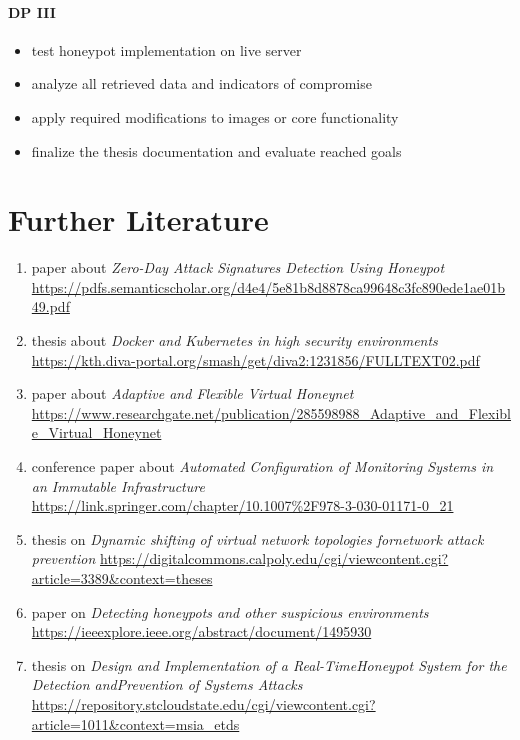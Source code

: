 \documentclass[12pt,a4paper,twoside]{report}
\begin{document}
\subsubsection{DP III}\label{dp-iii}

\begin{itemize}
\item
  test honeypot implementation on live server
\item
  analyze all retrieved data and indicators of compromise
\item
  apply required modifications to images or core functionality
\item
  finalize the thesis documentation and evaluate reached goals
\end{itemize}

\chapter{Further Literature}\label{further-literature}

\begin{enumerate}
	\item paper about \emph{Zero-Day Attack Signatures Detection Using Honeypot} \url{https://pdfs.semanticscholar.org/d4e4/5e81b8d8878ca99648c3fc890ede1ae01b49.pdf}
	
	\item thesis about \emph{Docker and Kubernetes in high security environments} \url{https://kth.diva-portal.org/smash/get/diva2:1231856/FULLTEXT02.pdf}
	
	\item paper about \emph{Adaptive and Flexible Virtual Honeynet}
	\url{https://www.researchgate.net/publication/285598988_Adaptive_and_Flexible_Virtual_Honeynet}
	
	\item conference paper about \emph{Automated Configuration of Monitoring Systems in an Immutable Infrastructure} \url{https://link.springer.com/chapter/10.1007%2F978-3-030-01171-0_21}
		
	\item thesis on \emph{Dynamic shifting of virtual network topologies fornetwork attack prevention} \url{https://digitalcommons.calpoly.edu/cgi/viewcontent.cgi?article=3389&context=theses}
	
	\item paper on \emph{Detecting honeypots and other suspicious environments} \url{https://ieeexplore.ieee.org/abstract/document/1495930}
	
	\item thesis on \emph{Design and Implementation of a Real-TimeHoneypot System for the Detection andPrevention of Systems Attacks} \url{https://repository.stcloudstate.edu/cgi/viewcontent.cgi?article=1011&context=msia_etds}
\end{enumerate}

\newpage


\end{document}
